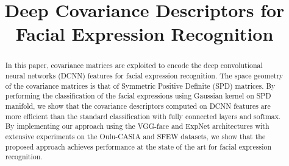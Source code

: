 \documentclass{bmvc2k}
\title{Deep Covariance Descriptors for Facial Expression Recognition}
\begin{document}
\maketitle

\begin{abstract}
In this paper, covariance matrices are exploited to encode the deep convolutional neural networks (DCNN) features for facial expression recognition. The space geometry of the covariance matrices is that of Symmetric Positive Definite (SPD) matrices. By performing the classification of the facial expressions using Gaussian kernel on SPD manifold, we show that the covariance descriptors computed on DCNN features are more efficient than the standard classification with fully connected layers and softmax. By implementing our approach using the VGG-face and ExpNet architectures with extensive experiments on the Oulu-CASIA and SFEW datasets, we show that the proposed approach achieves performance at the state of the art for facial expression recognition. 
\end{abstract}
\end{document}
